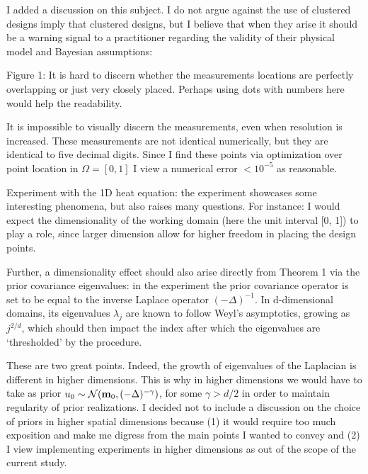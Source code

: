 \AR I added a discussion on this subject. I do not argue against the
use of clustered designs imply that clustered designs, but I believe
that when they arise it should be a warning signal to a practitioner
regarding the validity of their physical model and Bayesian
assumptions:

\begin{quote}
  
  
\end{quote}

\RC Figure 1: It is hard to discern whether the measurements locations
are perfectly overlapping or just very closely placed. Perhaps using
dots with numbers here would help the readability.
  
\AR It is impossible to visually discern the measurements, even when
resolution is increased. These measurements are not identical
numerically, but they are identical to five decimal digits. Since I
find these points via optimization over point location in
$\Omega=[0,1]$ I view a numerical error $<10^{-5}$ as reasonable.


\RC Experiment with the 1D heat equation: the experiment showcases
some interesting phenomena, but also raises many questions. For
instance: I would expect the dimensionality of the working domain
(here the unit interval [0, 1]) to play a role, since larger dimension
allow for higher freedom in placing the design points.

\RC Further, a dimensionality effect should also arise directly from
Theorem 1 via the prior covariance eigenvalues: in the experiment the
prior covariance operator is set to be equal to the inverse Laplace
operator $(-\Delta)^{-1}$. In d-dimensional domains, its eigenvalues
$\lambda_j$ are known to follow Weyl’s asymptotics, growing as
$j^{2/d}$, which should then impact the index after which the
eigenvalues are ‘thresholded’ by the procedure.

\AR These are two great points. Indeed, the growth of eigenvalues of
the Laplacian is different in higher dimensions. This is why in higher
dimensions we would have to take as prior \(u_0 \sim
\mathcal{N}(\mathbf{m}_0, (-\Delta)^{-\gamma})\), for some \(\gamma >
d/2\) in order to maintain regularity of prior realizations. I decided
not to include a discussion on the choice of priors in higher spatial
dimensions because (1) it would require too much exposition and make
me digress from the main points I wanted to convey and (2) I view
implementing experiments in higher dimensions as out of the scope of
the current study.



